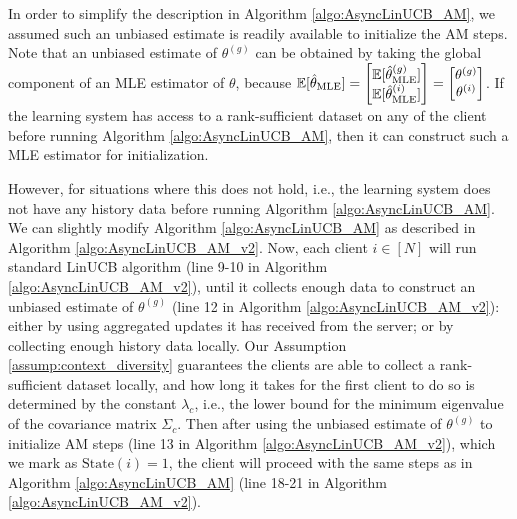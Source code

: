 \begin{remark}
In order to simplify the description in Algorithm \ref{algo:AsyncLinUCB_AM}, we assumed such an unbiased estimate is readily available to initialize the AM steps. 
Note that an unbiased estimate of $\theta^{(g)}$ can be obtained by taking the global component of an MLE estimator of $\theta$, because $\mathbb{E}[\hat{\theta}_{\text{MLE}}]=\begin{bmatrix}\mathbb{E}[\hat{\theta}^{(g)}_{\text{MLE}}]\\\mathbb{E}[\hat{\theta}^{(i)}_{\text{MLE}}]\end{bmatrix}=\begin{bmatrix} \theta^{(g)}\\ \theta^{(i)} \end{bmatrix}$.
If the learning system has access to a rank-sufficient dataset on any of the client before running Algorithm \ref{algo:AsyncLinUCB_AM}, then it can construct such a MLE estimator for initialization.
\end{remark}

However, for situations where this does not hold, i.e., the learning system does not have any history data before running Algorithm \ref{algo:AsyncLinUCB_AM}. 
We can slightly modify Algorithm \ref{algo:AsyncLinUCB_AM} as described in Algorithm \ref{algo:AsyncLinUCB_AM_v2}. Now, each client $i\in [N]$ will run standard LinUCB algorithm (line 9-10 in Algorithm \ref{algo:AsyncLinUCB_AM_v2}), until it collects enough data to construct an unbiased estimate of $\theta^{(g)}$ (line 12 in Algorithm \ref{algo:AsyncLinUCB_AM_v2}): either by using aggregated updates it has received from the server; or by collecting enough history data locally. 
Our Assumption \ref{assump:context_diversity} guarantees the clients are able to collect a rank-sufficient dataset locally, and how long it takes for the first client to do so is determined by the constant $\lambda_{c}$, i.e., the lower bound for the minimum eigenvalue of the covariance matrix $\Sigma_{c}$.
Then after using the unbiased estimate of $\theta^{(g)}$ to initialize AM steps (line 13 in Algorithm \ref{algo:AsyncLinUCB_AM_v2}), which we mark as $\text{State}(i)=1$, the client will proceed with the same steps as in Algorithm \ref{algo:AsyncLinUCB_AM} (line 18-21 in Algorithm \ref{algo:AsyncLinUCB_AM_v2}).

